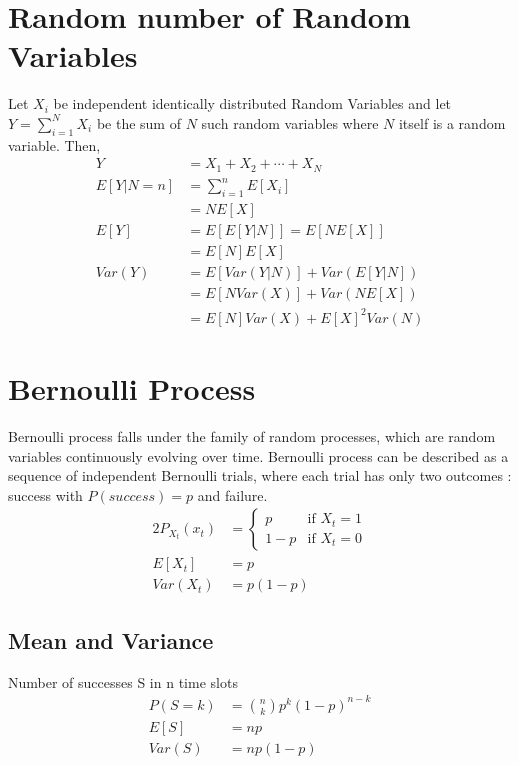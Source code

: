 \documentclass[11pt, a4paper]{article}
\begin{document}
    \section{Random number of Random Variables}
    Let $X_{i}$ be independent identically distributed Random Variables and let $Y = \sum_{i=1}^{N} X_{i}$ be the sum of $N$ such random variables where $N$ itself is a random variable. Then,
    \begin{align*}
        Y &= X_{1} + X_{2} + \cdots + X_{N}\\
        E[Y|N=n] &= \sum_{i=1}^{n}E[X_{i}]\\
                &= NE[X]\\
        E[Y] &= E[E[Y|N]] = E[NE[X]]\\
            &= E[N]E[X] \tag*{since $E[X]$ will be a number}\\
        Var(Y) &= E[Var(Y|N)] + Var(E[Y|N])\\
            &= E[NVar(X)] + Var(NE[X])\\
            &= E[N]Var(X) + E[X]^{2}Var(N)
    \end{align*}

    \section{Bernoulli Process}
    Bernoulli process falls under the family of random processes, which are random variables continuously evolving over time. Bernoulli process can be described as a sequence of independent Bernoulli trials, where each trial has only two outcomes : success with $P(success) = p$ and failure.
    \begin{alignat*}{2}
        P_{X_{t}}(x_{t}) &= \begin{cases} p &\mbox{if $X_{t} = 1$}\\
                                        1-p &\mbox{if $X_{t} = 0$} \end{cases}\\
        E[X_{t}] &= p\\
        Var(X_{t}) &= p(1-p)
    \end{alignat*}

    \subsection{Mean and Variance}
    Number of successes S in n time slots
    \begin{align*}
        P(S=k) &= \binom{n}{k} p^{k}(1-p)^{n-k}\\
        E[S] &= np\\
        Var(S) &= np(1-p)
    \end{align*}
\end{document}
